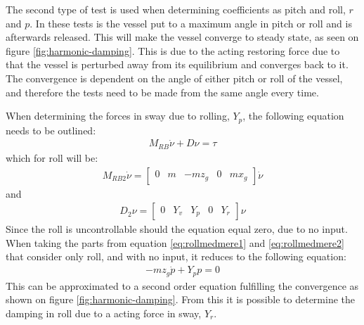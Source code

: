 The second type of test is used when determining coefficients as pitch and roll, $r$ and $p$. In these tests is the vessel put to a maximum angle in pitch or roll and is afterwards released. This will make the vessel converge to steady state, as seen on figure \ref{fig:harmonic-damping}. This is due to the acting restoring force due to that the vessel is perturbed away from its equilibrium and converges back to it. The convergence is dependent on the angle of either pitch or roll of the vessel, and therefore the tests need to be made from the same angle every time.

When determining the forces in sway due to rolling, $Y_p$, the following equation needs to be outlined:
\begin{align}
M_{RB} \dot \nu + D \nu = \tau
\end{align}
which for roll will be:
\begin{align}
M_{RB2} \dot \nu =
\begin{bmatrix}
0 & m & -mz_g & 0 & mx_g
\end{bmatrix}
\dot \nu
\label{eq:rollmedmere1}
\end{align}
and
\begin{align}
D_2 \nu =
\begin{bmatrix}
0 & Y_v & Y_p & 0 & Y_r
\end{bmatrix}
\nu
\label{eq:rollmedmere2}
\end{align}
Since the roll is uncontrollable should the equation equal zero, due to no input. When taking the parts from equation \ref{eq:rollmedmere1} and \ref{eq:rollmedmere2} that consider only roll, and with no input, it reduces to the following equation:
\begin{align}
-mz_g \dot p + Y_pp = 0
\end{align}
This can be approximated to a second order equation fulfilling the convergence as shown on figure \ref{fig:harmonic-damping}. From this it is possible to determine the damping in roll due to a acting force in sway, $Y_r$.

